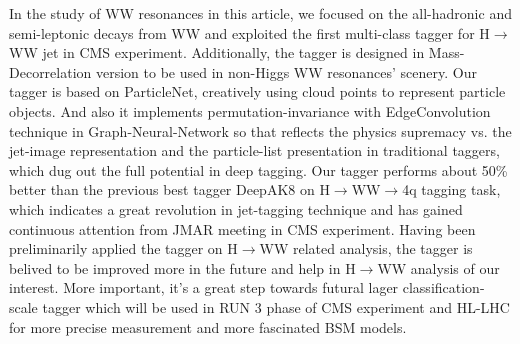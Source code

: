 \begin{eabstract}
    In the study of WW resonances in this article, we focused on the all-hadronic and semi-leptonic decays from WW and exploited the first multi-class tagger for H$\to$WW jet in CMS experiment. Additionally, the tagger is designed in Mass-Decorrelation version to be used in non-Higgs WW resonances' scenery. Our tagger is based on ParticleNet, creatively using cloud points to represent particle objects. And also it implements permutation-invariance with EdgeConvolution technique in Graph-Neural-Network so that reflects the physics supremacy vs. the jet-image representation and the particle-list presentation in traditional taggers, which dug out the full potential in deep tagging. Our tagger performs about 50\% better than the previous best tagger DeepAK8 on H$\to$WW$\to$4q tagging task, which indicates a great revolution in jet-tagging technique and has gained continuous attention from JMAR meeting in CMS experiment. Having been preliminarily applied the tagger on H$\to$WW related analysis, the tagger is belived to be improved more in the future and help in H$\to$WW analysis of our interest. More important, it's a great step towards futural lager classification-scale tagger which will be used in RUN 3 phase of CMS experiment and HL-LHC for more precise measurement and more fascinated BSM models.
\end{eabstract}


